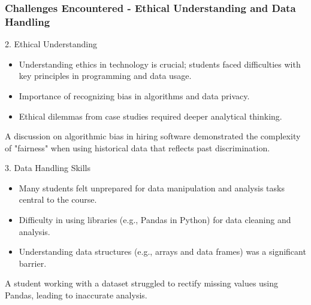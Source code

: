 \documentclass[aspectratio=169]{beamer}
\begin{document}
\begin{frame}[fragile]
    \frametitle{Challenges Encountered - Ethical Understanding and Data Handling}
    \begin{block}{2. Ethical Understanding}
        \begin{itemize}
            \item Understanding ethics in technology is crucial; students faced difficulties with key principles in programming and data usage.
            \item Importance of recognizing bias in algorithms and data privacy.
            \item Ethical dilemmas from case studies required deeper analytical thinking.
        \end{itemize}
    \end{block}
    \begin{example}
        A discussion on algorithmic bias in hiring software demonstrated the complexity of "fairness" when using historical data that reflects past discrimination.
    \end{example}

    \begin{block}{3. Data Handling Skills}
        \begin{itemize}
            \item Many students felt unprepared for data manipulation and analysis tasks central to the course.
            \item Difficulty in using libraries (e.g., Pandas in Python) for data cleaning and analysis.
            \item Understanding data structures (e.g., arrays and data frames) was a significant barrier.
        \end{itemize}
    \end{block}
    \begin{example}
        A student working with a dataset struggled to rectify missing values using Pandas, leading to inaccurate analysis.
    \end{example}
\end{frame}
\end{document}
